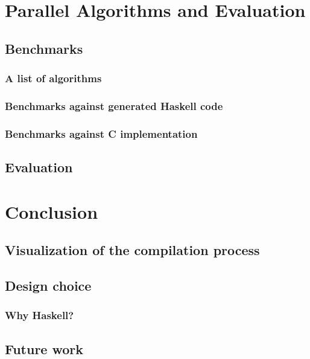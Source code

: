 \documentclass[a4paper, twoside]{report}
\begin{document}
% 
\chapter{Parallel Algorithms and Evaluation}
\section{Benchmarks}
\subsection{A list of algorithms}
\subsection{Benchmarks against generated Haskell code}
\subsection{Benchmarks against C implementation}
\section{Evaluation}

\chapter{Conclusion}
\section{Visualization of the compilation process}
\section{Design choice}
\subsection{Why Haskell?}
\section{Future work}
% 
% 



\end{document}
